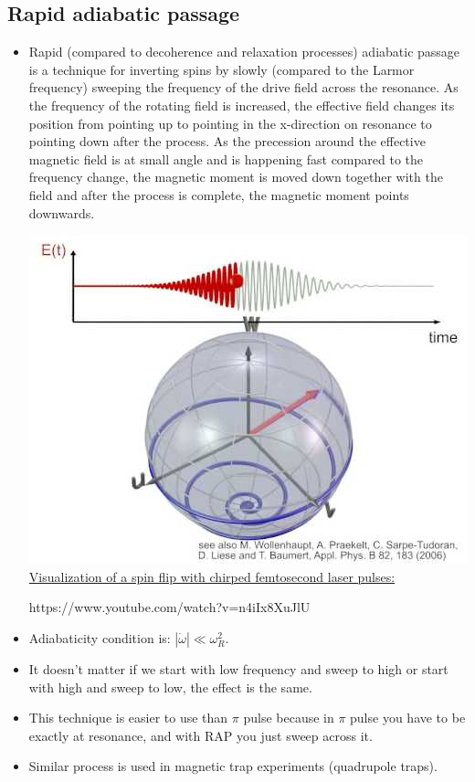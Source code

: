 \documentclass[AtomicOptical1Notes.tex]{subfiles}
\begin{document}
	\subsection{Rapid adiabatic passage}
		\begin{itemize}
			\item Rapid (compared to decoherence and relaxation processes) adiabatic passage is a technique for inverting spins by slowly (compared to the Larmor frequency) sweeping the frequency of the drive field across the resonance. As the frequency of the rotating field is increased, the effective field changes its position from pointing up to pointing in the x-direction on resonance to pointing down after the process. As the precession around the effective magnetic field is at small angle and is happening fast compared to the frequency change, the magnetic moment is moved down together with the field and after the process is complete, the magnetic moment points downwards.
			
			\includegraphics{spinflip}
			\href{https://www.youtube.com/watch?v=n4iIx8XuJlU}{Visualization of a spin flip with chirped femtosecond laser pulses:}

			https://www.youtube.com/watch?v=n4iIx8XuJlU
			
			\item Adiabaticity condition is: $ |\dot{\omega}| \ll \omega_R^2$.
			\item It doesn't matter if we start with low frequency and sweep to high or start with high and sweep to low, the effect is the same.
			\item This technique is easier to use than $\pi$ pulse because in $\pi$ pulse you have to be exactly at resonance, and with RAP you just sweep across it.
			\item Similar process is used in magnetic trap experiments (quadrupole traps).
		\end{itemize}
\end{document}
